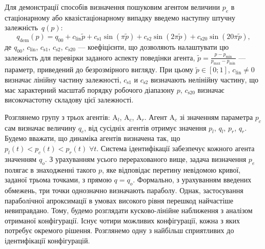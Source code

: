 \documentclass[a4paper,13pt]{atuaref}
\begin{document}
Для демонстрації способів визначення пошуковим агентом величини $p_e$ в
стаціонарному або квазістаціонарному випадку введемо наступну штучну залежність~$q(p)$:
%
\begin{equation}
  q_\mathrm{dem}(p) = q_{00} + c_\mathrm{lin} \tilde{p} + c_\mathrm{s1} \sin( \pi \tilde{p} ) + c_\mathrm{s2} \sin( 2 \pi \tilde{p} ) + c_\mathrm{s20} \sin( 20 \pi \tilde{p} ),
  \label{atu:eq:q_dem}
\end{equation}
%
де $q_{00}$, $c_\mathrm{lin}$, $c_\mathrm{s1}$, $c_\mathrm{s2}$, $c_\mathrm{s20}$
---
коефіцієнти, що дозволяють налаштувати цю залежність для перевірки заданого аспекту поведінки агента,
$\tilde{p} = \frac{p - p_{\min}}{p_{\max} - p_{\min}}$
---
параметр, приведений до безрозмірного вигляду.
При цьому $\tilde{p} \in[0;1]$, $c_\mathrm{lin} \ne 0$
визначає лінійну частину залежності,
$c_\mathrm{s1}$ и $c_\mathrm{s2}$
визначають нелінійну частину, що має характерний масштаб порядку робочого діапазону $p$,
$c_\mathrm{s20}$ визначає високочастотну складову цієї залежності.

%
%


Розглянемо групу з трьох агентів:
$\mathrm{A}_l$,
$\mathrm{A}_c$,
$\mathrm{A}_r$.
%
Агент $\mathrm {A} _c$ зі значенням параметра $p_c$ сам визначає величину
$q_c$, від сусідніх агентів отримує значення $p_l$, $q_l$, $p_r$, $q_r$.
Будемо вважати, що динаміка агентів визначена так, що
$p_l(t) < p_c (t) < p_r(t) \; \forall t$.
Система ідентифікації забезпечує кожного агента
значенням $q_o$. З урахуванням усього перерахованого вище, задача
визначення $p_e$ полягає в знаходженні такого $p$, яке відповідає перетину
невідомою кривої, заданої трьома точками, з прямою $q = q_o$.
Формально, з урахуванням введених обмежень, три точки однозначно визначають параболу. Однак,
застосування параболічної апроксимації в умовах високого рівня перешкод
найчастіше невиправдано.
Тому, будемо розглядати кусково-лінійне наближення з
аналізом отриманої конфігурації. Існує чотири можливих конфігурації,
кожна з яких потребує окремого рішення. Розглянемо одну з найбільш
сприятливих до ідентифікації конфігурацій.
\end{document}
